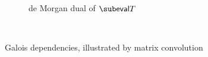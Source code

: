 \begin{figure}
\begin{subfigure}{0.46\textwidth}
      \vspace{2mm}
      \caption{de Morgan dual of $\GC{eval}{T}$}
   \end{subfigure}\\
   \vspace{5mm}
   \begin{subfigure}[t]{3.3in}
      \small
      
   \end{subfigure}
   \begin{subfigure}[t]{2.1in}
      \small
      
   \end{subfigure}
   \caption{Galois dependencies, illustrated by matrix convolution}
\end{figure}
